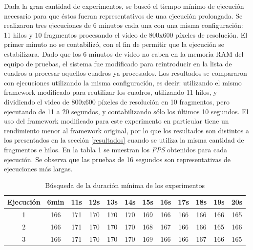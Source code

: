 Dada la gran cantidad de experimentos, se buscó el tiempo mínimo de ejecución
necesario para que éstos fueran representativos de una ejecución prolongada. Se
realizaron tres ejecuciones de 6 minutos cada una con una misma configuración:
11 hilos y 10 fragmentos procesando el video de 800x600 píxeles de resolución.
El primer minuto no se contabilizó, con el fin de permitir que la ejecución se
estabilizara. Dado que los 6 minutos de video no caben en la memoria RAM del
equipo de pruebas, el sistema fue modificado para reintroducir en la lista de
cuadros a procesar aquellos cuadros ya procesados. Los resultados se compararon
con ejecuciones utilizando la misma configuración, es decir: utilizando el mismo
framework modificado para reutilizar los cuadros, utilizando 11 hilos, y
dividiendo el video de 800x600 píxeles de resolución en 10 fragmentos, pero
ejecutando de 11 a 20 segundos, y contabilizando sólo los últimos 10 segundos.
El uso del framework modificado para este experimento en particular tiene un
rendimiento menor al framework original, por lo que los resultados son distintos
a los presentados en la sección \ref{resultados} cuando se utiliza la misma
cantidad de fragmentos e hilos. En la tabla 1 se muestran los \emph{FPS}
obtenidos para cada ejecución. Se observa que las pruebas de 16 segundos son
representativas de ejecuciones más largas.

\begin{table}[h]
	\centering
	\begin{tabular}{c||c|c|c|c|c|c|c|c|c|c|c}

		Ejecución&6min&11s&12s&13s&14s&15s&16s&17s&18s&19s&20s\\

		\hline
		\hline

		1&166& 171& 170& 170& 170& 169& 166& 166& 166& 166& 165\\

		\hline

		2&166& 171& 170& 170& 170& 168& 167& 166& 166& 165& 166\\

		\hline

		3&166& 171& 170& 170& 170& 169& 166& 166& 167& 166& 165

	\end{tabular}

	\caption{Búsqueda de la duración mínima de los experimentos}

\label{tabla}

\end{table}


